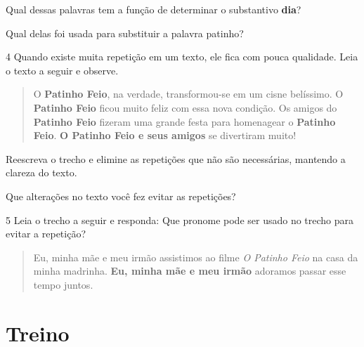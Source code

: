 \begin{conteudo}
\begin{conteudo}
\begin{conteudo}
\begin{conteudo}
\begin{escolha}
\item Qual dessas palavras tem a função de determinar o substantivo \textbf{dia}?
\item{}

\item Qual delas foi usada para substituir a palavra patinho?
\item{}
\end{escolha}

\num{4} Quando existe muita repetição em um texto, ele fica com pouca
qualidade. Leia o texto a seguir e observe.

\begin{quote}
O \textbf{Patinho Feio}, na verdade, transformou-se em um cisne
belíssimo. O \textbf{Patinho Feio} ficou muito feliz com essa nova
condição. Os amigos do \textbf{Patinho Feio} fizeram uma grande festa
para homenagear o \textbf{Patinho Feio}. \textbf{O Patinho Feio e seus
amigos} se divertiram muito!
\end{quote}

\begin{escolha}
\item Reescreva o trecho e elimine as repetições que não são necessárias,
mantendo a clareza do texto.
\item{}

\item Que alterações no texto você fez evitar as repetições?
\item{}
\end{escolha}

\num{5} Leia o trecho a seguir e responda: Que pronome pode ser usado 
no trecho para evitar a repetição?

\begin{quote}
Eu, minha mãe e meu irmão assistimos ao filme \textit{O Patinho Feio} na
casa da minha madrinha. \textbf{Eu, minha mãe e meu irmão} adoramos passar
esse tempo juntos.
\end{quote}


\section{Treino}


\end{conteudo}
\end{conteudo}
\end{conteudo}
\end{conteudo}
